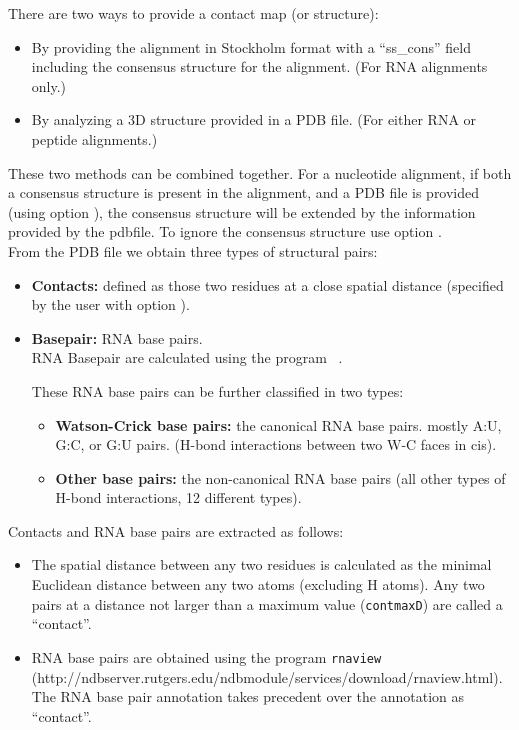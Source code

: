 \noindent
There are two ways to provide a contact map (or structure):

\begin{itemize}

\item By providing the alignment in Stockholm format with a ``ss\_cons'' field including the consensus
structure for the alignment. (For RNA alignments only.)

\item By analyzing a 3D structure provided in a PDB file. (For either RNA or peptide alignments.)\\
\end{itemize}

\noindent
These two methods can be combined together. For a nucleotide
alignment, if both a consensus structure is present in the alignment,
and a PDB file is provided (using option ), the
consensus structure will be extended by the information provided by
the pdbfile.  To ignore the consensus structure use
option .\\


\noindent
From the PDB file we obtain three types of structural pairs:

\begin{itemize}
\item \textbf{Contacts:} defined as those two residues at a close spatial distance (specified by the user with option ).
\item \textbf{Basepair:} RNA base pairs. \\
RNA Basepair are calculated using the program ~\citep{YangWesthof03}.

These RNA base pairs can be further classified in two types:
\begin{itemize}
\item \textbf{Watson-Crick base pairs:} the canonical RNA base pairs. mostly A:U, G:C, or G:U pairs. (H-bond interactions between two W-C faces in cis).
\item \textbf{Other base pairs:} the non-canonical RNA base pairs (all other types of H-bond interactions, 12 different types).
\end{itemize}
\end{itemize}

Contacts and RNA base pairs are extracted as follows:
\begin{itemize}

\item The spatial distance between any two residues is calculated as the  minimal Euclidean distance between any two atoms (excluding
 H atoms). Any two pairs at a distance not larger than a maximum value
(\texttt{contmaxD}) are called a ``contact''.

\item RNA base pairs are obtained using the program \texttt{rnaview}~\citep{YangWesthof03}\\
(http://ndbserver.rutgers.edu/ndbmodule/services/download/rnaview.html).\\
The RNA base pair annotation takes precedent over the annotation as ``contact''.
\end{itemize}

